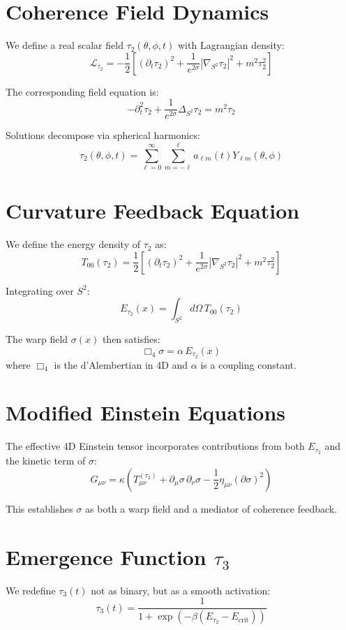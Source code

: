 \documentclass[12pt]{article}
\begin{document}
\section{Coherence Field Dynamics}
We define a real scalar field \( \tau_2(\theta, \phi, t) \) with Lagrangian density:
\[
\mathcal{L}_{\tau_2} = -\frac{1}{2} \left[ (\partial_t \tau_2)^2 + \frac{1}{e^{2\sigma}} |\nabla_{S^2} \tau_2|^2 + m^2 \tau_2^2 \right]
\]

The corresponding field equation is:
\[
-\partial_t^2 \tau_2 + \frac{1}{e^{2\sigma}} \Delta_{S^2} \tau_2 = m^2 \tau_2
\]

Solutions decompose via spherical harmonics:
\[
\tau_2(\theta, \phi, t) = \sum_{\ell=0}^\infty \sum_{m=-\ell}^{\ell} a_{\ell m}(t) Y_{\ell m}(\theta, \phi)
\]

\section{Curvature Feedback Equation}
We define the energy density of \( \tau_2 \) as:
\[
T_{00}(\tau_2) = \frac{1}{2} \left[ (\partial_t \tau_2)^2 + \frac{1}{e^{2\sigma}} |\nabla_{S^2} \tau_2|^2 + m^2 \tau_2^2 \right]
\]

Integrating over \( S^2 \):
\[
E_{\tau_2}(x) = \int_{S^2} d\Omega \, T_{00}(\tau_2)
\]

The warp field \( \sigma(x) \) then satisfies:
\[
\Box_4 \sigma = \alpha \, E_{\tau_2}(x)
\]
where \( \Box_4 \) is the d'Alembertian in 4D and \( \alpha \) is a coupling constant.

\section{Modified Einstein Equations}
The effective 4D Einstein tensor incorporates contributions from both \( E_{\tau_2} \) and the kinetic term of \( \sigma \):
\[
G_{\mu\nu} = \kappa \left( T_{\mu\nu}^{(\tau_2)} + \partial_\mu \sigma \, \partial_\nu \sigma - \frac{1}{2} \eta_{\mu\nu} (\partial \sigma)^2 \right)
\]

This establishes \( \sigma \) as both a warp field and a mediator of coherence feedback.

\section{Emergence Function \( \tau_3 \)}
We redefine \( \tau_3(t) \) not as binary, but as a smooth activation:
\[
\tau_3(t) = \frac{1}{1 + \exp(-\beta (E_{\tau_2} - E_{\text{crit}}))}
\]
\end{document}
